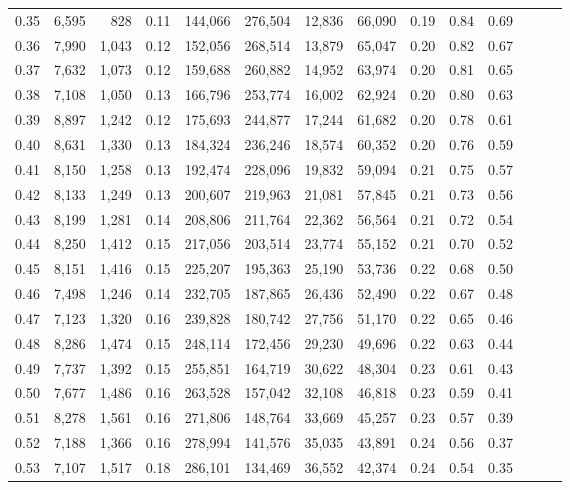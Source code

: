 \begin{tabular}{rrrrrrrrrrrrrr}
0.35 &  6,595 &    828 &  0.11 &  144,066 &  276,504 &  12,836 &  66,090 &  0.19 &  0.84 &      0.69 \\
0.36 &  7,990 &  1,043 &  0.12 &  152,056 &  268,514 &  13,879 &  65,047 &  0.20 &  0.82 &      0.67 \\
0.37 &  7,632 &  1,073 &  0.12 &  159,688 &  260,882 &  14,952 &  63,974 &  0.20 &  0.81 &      0.65 \\
0.38 &  7,108 &  1,050 &  0.13 &  166,796 &  253,774 &  16,002 &  62,924 &  0.20 &  0.80 &      0.63 \\
0.39 &  8,897 &  1,242 &  0.12 &  175,693 &  244,877 &  17,244 &  61,682 &  0.20 &  0.78 &      0.61 \\
0.40 &  8,631 &  1,330 &  0.13 &  184,324 &  236,246 &  18,574 &  60,352 &  0.20 &  0.76 &      0.59 \\
0.41 &  8,150 &  1,258 &  0.13 &  192,474 &  228,096 &  19,832 &  59,094 &  0.21 &  0.75 &      0.57 \\
0.42 &  8,133 &  1,249 &  0.13 &  200,607 &  219,963 &  21,081 &  57,845 &  0.21 &  0.73 &      0.56 \\
0.43 &  8,199 &  1,281 &  0.14 &  208,806 &  211,764 &  22,362 &  56,564 &  0.21 &  0.72 &      0.54 \\
0.44 &  8,250 &  1,412 &  0.15 &  217,056 &  203,514 &  23,774 &  55,152 &  0.21 &  0.70 &      0.52 \\
0.45 &  8,151 &  1,416 &  0.15 &  225,207 &  195,363 &  25,190 &  53,736 &  0.22 &  0.68 &      0.50 \\
0.46 &  7,498 &  1,246 &  0.14 &  232,705 &  187,865 &  26,436 &  52,490 &  0.22 &  0.67 &      0.48 \\
0.47 &  7,123 &  1,320 &  0.16 &  239,828 &  180,742 &  27,756 &  51,170 &  0.22 &  0.65 &      0.46 \\
0.48 &  8,286 &  1,474 &  0.15 &  248,114 &  172,456 &  29,230 &  49,696 &  0.22 &  0.63 &      0.44 \\
0.49 &  7,737 &  1,392 &  0.15 &  255,851 &  164,719 &  30,622 &  48,304 &  0.23 &  0.61 &      0.43 \\
0.50 &  7,677 &  1,486 &  0.16 &  263,528 &  157,042 &  32,108 &  46,818 &  0.23 &  0.59 &      0.41 \\
0.51 &  8,278 &  1,561 &  0.16 &  271,806 &  148,764 &  33,669 &  45,257 &  0.23 &  0.57 &      0.39 \\
0.52 &  7,188 &  1,366 &  0.16 &  278,994 &  141,576 &  35,035 &  43,891 &  0.24 &  0.56 &      0.37 \\
0.53 &  7,107 &  1,517 &  0.18 &  286,101 &  134,469 &  36,552 &  42,374 &  0.24 &  0.54 &      0.35 \\

\end{tabular}
